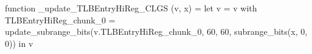 function _update_TLBEntryHiReg_CLGS (v, x) = let v = { v with TLBEntryHiReg_chunk_0 = update_subrange_bits(v.TLBEntryHiReg_chunk_0, 60, 60, subrange_bits(x, 0, 0)) } in
  v
